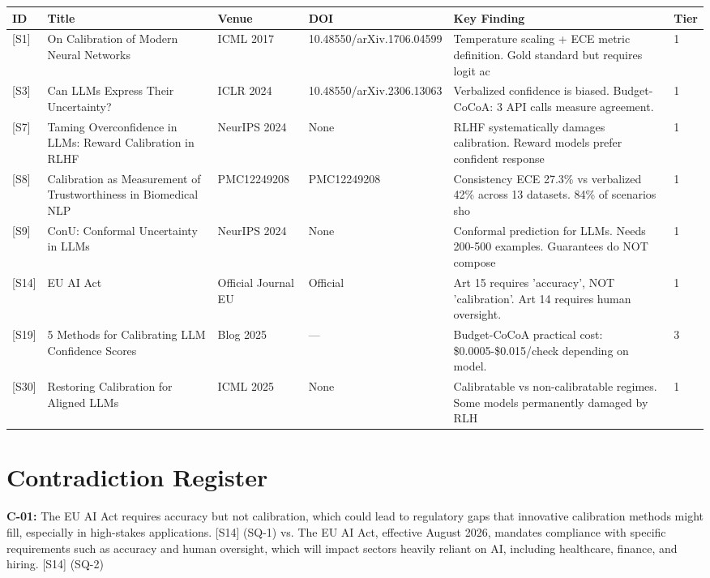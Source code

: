 \documentclass[a4paper,11pt]{article}
\begin{document}
\begin{tabularx}{\linewidth}{@{}l X X X X X@{}}
\toprule
\textbf{ID} & \textbf{Title} & \textbf{Venue} & \textbf{DOI} & \textbf{Key Finding} & \textbf{Tier} \\
\midrule
\textcolor{primary}{[S1]} & On Calibration of Modern Neural Networks & ICML 2017 & 10.48550/arXiv.1706.04599 & Temperature scaling + ECE metric definition. Gold standard but requires logit ac & 1 \\
\textcolor{primary}{[S3]} & Can LLMs Express Their Uncertainty? & ICLR 2024 & 10.48550/arXiv.2306.13063 & Verbalized confidence is biased. Budget-CoCoA: 3 API calls measure agreement. & 1 \\
\textcolor{primary}{[S7]} & Taming Overconfidence in LLMs: Reward Calibration in RLHF & NeurIPS 2024 & None & RLHF systematically damages calibration. Reward models prefer confident response & 1 \\
\textcolor{primary}{[S8]} & Calibration as Measurement of Trustworthiness in Biomedical NLP & PMC12249208 & PMC12249208 & Consistency ECE 27.3\% vs verbalized 42\% across 13 datasets. 84\% of scenarios sho & 1 \\
\textcolor{primary}{[S9]} & ConU: Conformal Uncertainty in LLMs & NeurIPS 2024 & None & Conformal prediction for LLMs. Needs 200-500 examples. Guarantees do NOT compose & 1 \\
\textcolor{primary}{[S14]} & EU AI Act & Official Journal EU & Official & Art 15 requires 'accuracy', NOT 'calibration'. Art 14 requires human oversight. & 1 \\
\textcolor{primary}{[S19]} & 5 Methods for Calibrating LLM Confidence Scores & Blog 2025 & — & Budget-CoCoA practical cost: \$0.0005-\$0.015/check depending on model. & 3 \\
\textcolor{primary}{[S30]} & Restoring Calibration for Aligned LLMs & ICML 2025 & None & Calibratable vs non-calibratable regimes. Some models permanently damaged by RLH & 1 \\
\bottomrule
\end{tabularx}
\vspace{8pt}


\section{Contradiction Register}

\textbf{C-01:} The EU AI Act requires accuracy but not calibration, which could lead to regulatory gaps that innovative calibration methods might fill, especially in high-stakes applications. \textcolor{primary}{[S14]} (SQ-1) vs. The EU AI Act, effective August 2026, mandates compliance with specific requirements such as accuracy and human oversight, which will impact sectors heavily reliant on AI, including healthcare, finance, and hiring. \textcolor{primary}{[S14]} (SQ-2)
\end{document}
